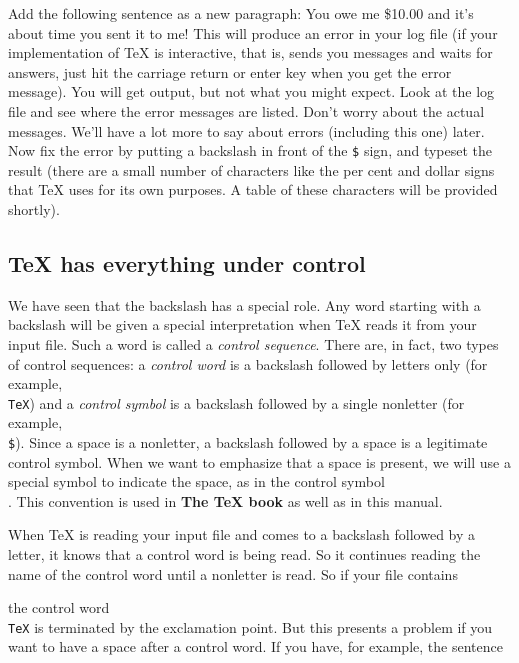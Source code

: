 \exercise Add the following sentence as a new paragraph: 
\beginuser 
You owe me \$10.00 and it's about time you sent it to me! 
\enduser 
\noindent 
This will produce an error in your log file (if your 
implementation of \TeX{} is interactive, that is, sends you 
messages and waits for answers, just hit the carriage return or 
enter key when you get the error message). You will get output, 
but not what you might expect. Look at the log file and see 
where the error messages are listed. Don't worry about the 
actual messages. We'll have a lot more to say about errors 
(including this one) later. Now fix the error by putting a 
backslash in front of the {\tt \$} sign, and typeset the result 
(there are a small number of characters like the per cent and 
dollar signs that \TeX{} uses for its own purposes. A table of 
these characters will be provided shortly). 
 
\subsection{\TeX{} has everything under control} 
 
We have seen that the backslash has a special role. Any word 
starting with a backslash will be given a special interpretation 
when \TeX{} reads it from your input file. Such a word is called 
a {\sl control sequence}. There are, in fact, two types of 
control sequences: a {\sl control word\/} is a backslash followed 
by letters only (for example, {\tt \\TeX}) and a {\sl control 
symbol\/} is a backslash followed by a single nonletter (for 
example, {\tt \\\$})\null. Since a space is a nonletter, a 
backslash followed by a space is a legitimate control symbol. 
When we want to emphasize that a space is present, we will use a 
special symbol {\tt\sp} to indicate the space, as in the control 
symbol {\tt\\\sp}.  This convention is used in {\bf The \TeX 
book} as well as in this manual. 
 
When \TeX{} is reading your input file and comes to a backslash 
followed by a letter, it knows that a control word is being 
read. So it continues reading the name of the control word until 
a nonletter is read. So if your file contains 
 
 
\noindent 
the control word {\tt \\TeX} is terminated by the exclamation 
point. But this presents a problem if you want to have a space 
after a control word. If you have, for example, the sentence 
 
